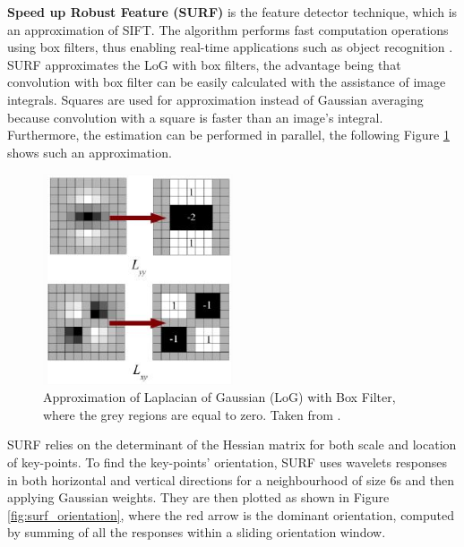 \textbf{Speed up Robust Feature (SURF)} is the feature detector technique, which is an approximation of SIFT. The algorithm performs fast computation operations using box filters, thus enabling real-time applications such as object recognition \cite{BAY2008346}. SURF approximates the LoG with box filters, the advantage being that convolution with box filter can be easily calculated with the assistance of image integrals. Squares are used for approximation instead of Gaussian averaging because convolution with a square is faster than an image's integral. Furthermore, the estimation can be performed in parallel, the following Figure \ref{fig:surf_approximation} shows such an approximation. 

\begin{figure}[H]
    \centering
    \includegraphics[width=0.5\textwidth]{UCT_MSc_Thesis/figs/surf_approximation.png}
    \caption[Laplacian of Gaussian (LoG)]{Approximation of Laplacian of Gaussian (LoG) with Box Filter, where the grey regions are equal to zero.  Taken from \cite{BAY2008346}.}
    \label{fig:surf_approximation}
\end{figure}

SURF relies on the determinant of the Hessian matrix for both scale and location of key-points. To find the key-points' orientation, SURF uses wavelets responses in both horizontal and vertical directions for a neighbourhood of size 6s and then applying Gaussian weights. They are then plotted as shown in Figure \ref{fig:surf_orientation}, where the red arrow is the dominant orientation, computed by summing of all the responses within a sliding orientation window. 

